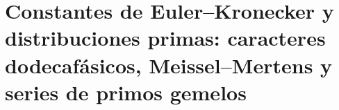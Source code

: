\chapter{Constantes de Euler--Kronecker y distribuciones primas: caracteres dodecafásicos, Meissel--Mertens y series de primos gemelos}
\label{chap:p3-final:42:euler_kronecker_primos}

